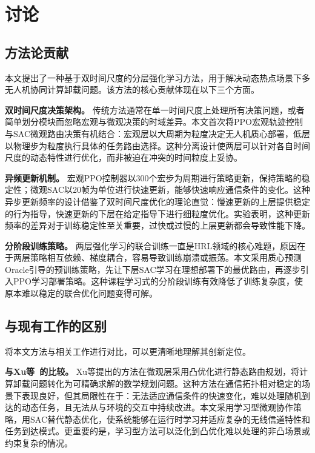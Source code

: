 \section{讨论}

\subsection{方法论贡献}

本文提出了一种基于双时间尺度的分层强化学习方法，用于解决动态热点场景下多无人机协同计算卸载问题。该方法的核心贡献体现在以下三个方面。

\textbf{双时间尺度决策架构。} 传统方法通常在单一时间尺度上处理所有决策问题，或者简单划分模块而忽略宏观与微观决策的时域差异。本文首次将PPO宏观轨迹控制与SAC微观路由决策有机结合：宏观层以大周期为粒度决定无人机质心部署，低层以物理步为粒度执行具体的任务路由选择。这种分离设计使两层可以针对各自时间尺度的动态特性进行优化，而非被迫在冲突的时间粒度上妥协。

\textbf{异频更新机制。} 宏观PPO控制器以300个宏步为周期进行策略更新，保持策略的稳定性；微观SAC以20帧为单位进行快速更新，能够快速响应通信条件的变化。这种异步更新频率的设计借鉴了双时间尺度优化的理论直觉：慢速更新的上层提供稳定的行为指导，快速更新的下层在给定指导下进行细粒度优化。实验表明，这种更新频率的差异对于训练稳定性至关重要，过快或过慢的上层更新都会导致性能下降。

\textbf{分阶段训练策略。} 两层强化学习的联合训练一直是HRL领域的核心难题，原因在于两层策略相互依赖、梯度耦合，容易导致训练崩溃或振荡。本文采用质心预测Oracle引导的预训练策略，先让下层SAC学习在理想部署下的最优路由，再逐步引入PPO学习部署策略。这种课程学习式的分阶段训练有效降低了训练复杂度，使原本难以稳定的联合优化问题变得可解。

\subsection{与现有工作的区别}

将本文方法与相关工作进行对比，可以更清晰地理解其创新定位。

\textbf{与Xu等~\citep{xu2022trajectory}的比较。} Xu等提出的方法在微观层采用凸优化进行静态路由规划，将计算卸载问题转化为可精确求解的数学规划问题。这种方法在通信拓扑相对稳定的场景下表现良好，但其局限性在于：无法适应通信条件的快速变化，难以处理随机到达的动态任务，且无法从与环境的交互中持续改进。本文采用学习型微观协作策略，用SAC替代静态优化，使系统能够在运行时学习并适应复杂的无线信道特性和任务到达模式。更重要的是，学习型方法可以泛化到凸优化难以处理的非凸场景或约束复杂的情况。


